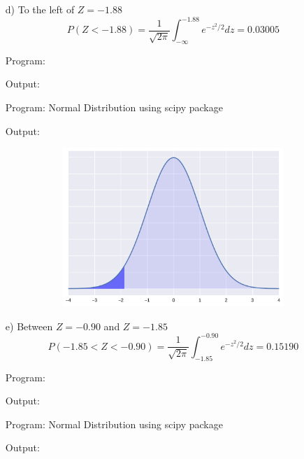 \documentclass[a4paper,10pt,openright]{report}
\begin{document}
\begin{enumerate}
\begin{enumerate}
\item[d)] To the left of $Z = -1.88$
\begin{equation*}
P(Z < -1.88) = \frac{1}{\sqrt{2\pi}} \int_{-\infty}^{-1.88} e^{-z^{2}/2} dz = 0.03005
\end{equation*}

\vspace{1cm}

Program:

Output:


\vspace{1cm}

Program: Normal Distribution using scipy package

Output:


\begin{figure}[ht!]
\includegraphics[width=12cm,height=6cm,keepaspectratio]{norm1d.pdf}
\centering
\end{figure}

\item[e)] Between $Z = -0.90$ and $Z = -1.85$
\begin{equation*}
P(-1.85 < Z < -0.90) = \frac{1}{\sqrt{2\pi}} \int_{-1.85}^{-0.90} e^{-z^{2}/2} dz = 0.15190 
\end{equation*}

\vspace{0.5cm}

Program:

Output:


\vspace{1cm}

Program: Normal Distribution using scipy package

Output:



\end{enumerate}
\end{enumerate}
\end{document}
